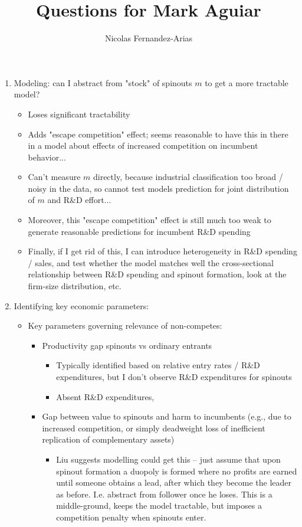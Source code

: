 \documentclass[12pt,english]{article}
\theoremstyle{remark}
\begin{document}
	
\title{Questions for Mark Aguiar}
\author{Nicolas Fernandez-Arias}
\maketitle

\begin{enumerate}
	\item Modeling: can I abstract from "stock" of spinouts $m$ to get a more tractable model? 
	\begin{itemize}
		\item Loses significant tractability
		\item Adds "escape competition" effect; seems reasonable to have this in there in a model about effects of increased competition on incumbent behavior...
		\item Can't measure $m$ directly, because industrial classification too broad / noisy in the data, so cannot test models prediction for joint distribution of $m$ and R\&D effort...
		\item Moreover, this "escape competition" effect is still much too weak to generate reasonable predictions for incumbent R\&D spending
		\item Finally, if I get rid of this, I can introduce heterogeneity in R\&D spending / sales, and test whether the model matches well the cross-sectional relationship between R\&D spending and spinout formation, look at the firm-size distribution, etc.
	\end{itemize}
	\item Identifying key economic parameters:
	\begin{itemize}
		\item Key parameters governing relevance of non-competes:
		\begin{itemize}
			\item Productivity gap spinouts vs ordinary entrants
			\begin{itemize}
				\item Typically identified based on relative entry rates / R\&D expenditures, but I don't observe R\&D expenditures for spinouts
				\item Absent R\&D expenditures, 
			\end{itemize}
			\item Gap between value to spinouts and harm to incumbents (e.g., due to increased competition, or simply deadweight loss of inefficient replication of complementary assets)
			\begin{itemize}
				\item Liu suggests modelling could get this -- just assume that upon spinout formation a duopoly is formed where no profits are earned until someone obtains a lead, after which they become the leader as before. I.e. abstract from follower once he loses. This is a middle-ground, keeps the model tractable, but imposes a competition penalty when spinouts enter. 

\end{itemize}
\end{itemize}
\end{itemize}
\end{enumerate}
\end{document}
